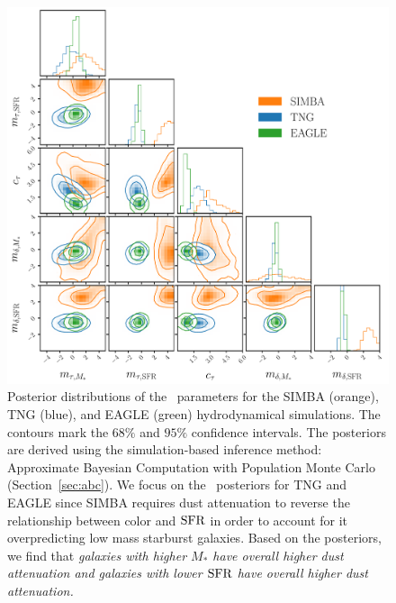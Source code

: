\begin{figure}
\begin{center}
    \includegraphics[width=\textwidth]{figs/abc.pdf}
    \caption{\label{fig:abc}
    Posterior distributions of the \eda~parameters for the SIMBA (orange), TNG
    (blue), and EAGLE (green) hydrodynamical simulations. The contours mark the $68\%$
    and $95\%$ confidence intervals. The posteriors are derived using the
    simulation-based inference method: Approximate Bayesian Computation with Population Monte Carlo
    (Section~\ref{sec:abc}). We focus on the \eda~posteriors for TNG and EAGLE
    since SIMBA requires dust attenuation to reverse the relationship between
    color and ${\rm SFR}$ in order to account for it overpredicting low mass starburst 
    galaxies. Based on the posteriors, we find that \emph{galaxies with higher
    $M_*$ have overall higher dust attenuation and galaxies with lower ${\rm SFR}$
    have overall higher dust attenuation.}
    }
\end{center}
\end{figure}



